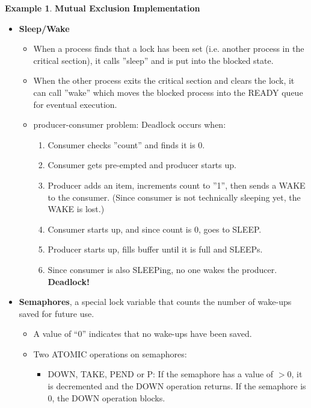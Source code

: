 \documentclass[11pt,a4paper]{article}
\theoremstyle{definition}
\newtheorem{example}{Example}[section]
\newenvironment{myitemize}
{ \begin{itemize}
    \setlength{\itemsep}{5pt}
    \setlength{\parskip}{0pt}
    \setlength{\parsep}{0pt}     }
{ \end{itemize}                  }
\newenvironment{myenumerate}
{ \begin{enumerate}
    \setlength{\itemsep}{5pt}
    \setlength{\parskip}{0pt}
    \setlength{\parsep}{0pt}     }
{ \end{enumerate}                }
\begin{document}
\begin{example}{\textbf{Mutual Exclusion Implementation}}
\begin{myitemize}
\begin{tcolorbox}
			\textbf{**Rescue for Peterson}: by using \textsf{turn}, which can be either 0 or 1, we prevent both process stuck and busy waiting, one of them will execute the critical section and then leave and make \textsf{interested = FALSE}. (as shown in the above code)
		\end{tcolorbox}
		\item \textbf{Sleep/Wake}
		\begin{myitemize}
			\item When a process finds that a lock has been set (i.e. another process in the critical section), it calls ''sleep'' and is put into the blocked state.
			\item When the other process exits the critical section and clears the lock, it can call ''wake'' which moves the blocked process into the READY queue for eventual execution.
		\end{myitemize}
		\begin{myitemize}
			\item \textsf{producer-consumer problem}: Deadlock occurs when:
			\begin{myenumerate}
				\item Consumer checks ''count'' and finds it is 0.
				\item Consumer gets pre-empted and producer starts up.
				\item Producer adds an item, increments count to ''1'', then sends  a WAKE to the consumer. (Since consumer is not technically sleeping yet, the WAKE is lost.)
				\item Consumer starts up, and since count is 0, goes to SLEEP.
				\item Producer starts up, fills buffer until it is full and SLEEPs.
				\item Since consumer is also SLEEPing, no one wakes the producer. \textbf{Deadlock!}
			\end{myenumerate}
		\end{myitemize}
		\item \textbf{Semaphores}, a special lock variable that counts the number of wake-ups saved for future use.
		\begin{myitemize}
			\item  A value of “0” indicates that no wake-ups have been saved.
			\item Two ATOMIC operations on semaphores:
			\begin{myitemize}
				\item DOWN, TAKE, PEND or P: If the semaphore has a value of $>0$, it is decremented and the DOWN operation returns. If the semaphore is 0, the DOWN operation blocks.

\end{myitemize}
\end{myitemize}
\end{myitemize}
\end{example}
\end{document}
